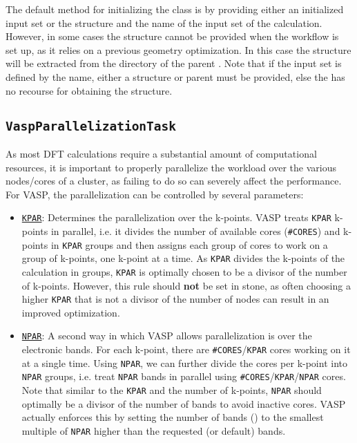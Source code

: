 \begin{refsection}
\begin{itemize}
\end{itemize} 
 
The default method for initializing the  class is by 
providing either an initialized input set or the structure and the name of the 
input set of the calculation. However, in some cases the structure cannot be 
provided when the workflow is set up, as it relies on a previous geometry 
optimization. In this case the structure will be extracted from the directory 
of the parent . Note that if the input set is defined by the 
name, either a structure or parent  must be provided, else the 
 has no recourse for obtaining the structure. 
 
\subsection{\texttt{VaspParallelizationTask}} 
\label{automation:sec-VaspParallelizationTask} 
 
As most \gls{DFT} calculations require a substantial amount of computational 
resources, it is important to properly parallelize the workload over the 
various nodes/cores of a cluster, as failing to do so can severely affect the 
performance. For \gls{VASP}, the parallelization can be controlled by 
several parameters: 
 
\begin{itemize} 

\item \href{https://cms.mpi.univie.ac.at/wiki/index.php/KPAR}{\texttt{KPAR}}: 
Determines the parallelization over the k-points. \gls{VASP} treats 
\texttt{KPAR} k-points in parallel, i.e. it divides the number of available cores (\texttt{\#CORES}) and 
k-points in \texttt{KPAR} groups and then assigns each group of cores to work 
on a group of k-points, one k-point at a time. As \texttt{KPAR} divides the 
k-points of the calculation in groups, \texttt{KPAR} is optimally chosen to be 
a divisor of the number of k-points. However, this rule should \textbf{not} be 
set in stone, as often choosing a higher \texttt{KPAR} that is not a divisor 
of the number of nodes can result in an improved optimization. 
 
\item \href{https://cms.mpi.univie.ac.at/wiki/index.php/NPAR}{\texttt{NPAR}}: 
A second way in which \gls{VASP} allows parallelization is over the 
electronic bands. For each k-point, there are \verb|#CORES|/\verb|KPAR| cores 
working on it at a single time. Using \verb|NPAR|, we can further divide the 
cores per k-point into \verb|NPAR| groups, i.e. treat \verb|NPAR| bands in 
parallel using \verb|#CORES|/\verb|KPAR|/\verb|NPAR| cores. Note that similar 
to the \verb|KPAR| and the number of k-points,  \verb|NPAR| should optimally 
be a divisor of the number of bands to avoid inactive cores. \gls{VASP} 
actually enforces this by setting the number of bands () to the 
smallest multiple of \verb|NPAR| higher than the requested (or default) bands. 
 

\end{itemize}
\end{refsection}
